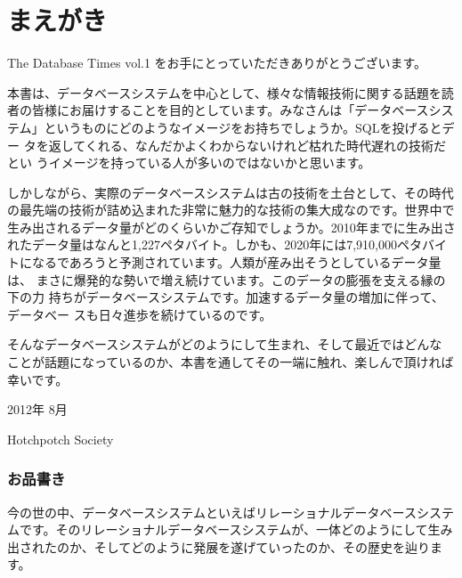 
\chapter*{まえがき}
\thispagestyle{plainhead}

The Database Times vol.1 をお手にとっていただきありがとうございます。

本書は、データベースシステムを中心として、様々な情報技術に関する話題を読
者の皆様にお届けすることを目的としています。みなさんは「データベースシス
テム」というものにどのようなイメージをお持ちでしょうか。SQLを投げるとデー
タを返してくれる、なんだかよくわからないけれど枯れた時代遅れの技術だとい
うイメージを持っている人が多いのではないかと思います。

しかしながら、実際のデータベースシステムは古の技術を土台として、その時代
の最先端の技術が詰め込まれた非常に魅力的な技術の集大成なのです。世界中で
生み出されるデータ量がどのくらいかご存知でしょうか。2010年までに生み出さ
れたデータ量はなんと1,227ペタバイト。しかも、2020年には7,910,000ペタバイ
トになるであろうと予測されています。人類が産み出そうとしているデータ量は、
まさに爆発的な勢いで増え続けています。このデータの膨張を支える縁の下の力
持ちがデータベースシステムです。加速するデータ量の増加に伴って、データベー
スも日々進歩を続けているのです。

そんなデータベースシステムがどのようにして生まれ、そして最近ではどんな
ことが話題になっているのか、本書を通してその一端に触れ、楽しんで頂ければ
幸いです。

\begin{flushright}
 2012年 8月

Hotchpotch Society
\end{flushright}

\newpage

\subsection*{お品書き}


今の世の中、データベースシステムといえばリレーショナルデータベースシステ
ムです。そのリレーショナルデータベースシステムが、一体どのようにして生み
出されたのか、そしてどのように発展を遂げていったのか、その歴史を辿ります。

\vspace*{\Cvs}


